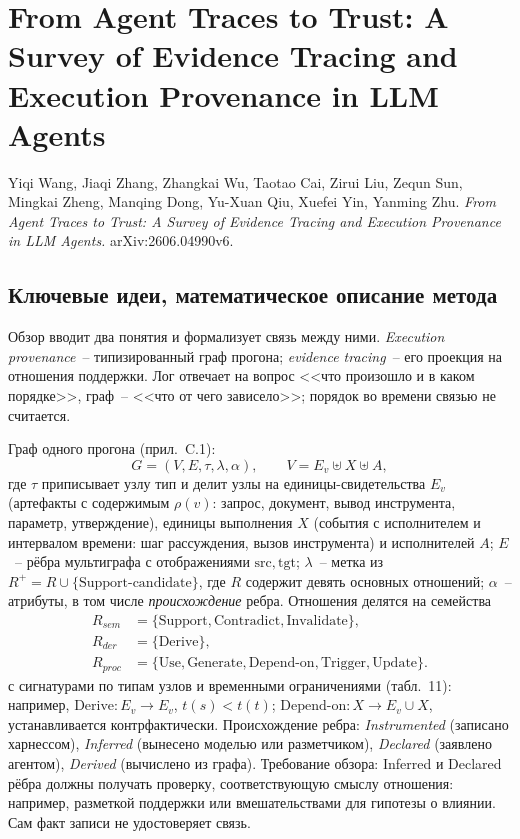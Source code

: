 \section{From Agent Traces to Trust: A Survey of Evidence Tracing and Execution Provenance in LLM Agents}

Yiqi Wang, Jiaqi Zhang, Zhangkai Wu, Taotao Cai, Zirui Liu, Zequn Sun, Mingkai Zheng,
Manqing Dong, Yu-Xuan Qiu, Xuefei Yin, Yanming Zhu. \emph{From Agent Traces to Trust:
A Survey of Evidence Tracing and Execution Provenance in LLM Agents.} arXiv:2606.04990v6.

\cite{wang2026survey}

\subsection{Ключевые идеи, математическое описание метода}
Обзор вводит два понятия и формализует связь между ними. \emph{Execution provenance}~--
типизированный граф прогона; \emph{evidence tracing}~-- его проекция на отношения
поддержки. Лог отвечает на вопрос <<что произошло и в каком порядке>>, граф~-- <<что от чего
зависело>>; порядок во времени связью не считается.

Граф одного прогона (прил.~C.1):
\begin{equation}
G = (V, E, \tau, \lambda, \alpha), \qquad V = E_v \uplus X \uplus A,
\end{equation}
где $\tau$ приписывает узлу тип и делит узлы на единицы-свидетельства $E_v$ (артефакты
с содержимым $\rho(v)$: запрос, документ, вывод инструмента, параметр, утверждение),
единицы выполнения $X$ (события с исполнителем и интервалом времени: шаг рассуждения,
вызов инструмента) и исполнителей $A$; $E$~-- рёбра мультиграфа с отображениями
$\mathrm{src},\mathrm{tgt}$; $\lambda$~-- метка из
$R^+=R\cup\{\text{Support-candidate}\}$, где $R$ содержит девять основных отношений;
$\alpha$~-- атрибуты,
в том числе \emph{происхождение} ребра. Отношения делятся на семейства
\begin{equation}
\begin{aligned}
R_{sem}&=\{\text{Support},\text{Contradict},\text{Invalidate}\},\\
R_{der}&=\{\text{Derive}\},\\
R_{proc}&=\{\text{Use},\text{Generate},\text{Depend-on},\text{Trigger},\text{Update}\}.
\end{aligned}
\end{equation}
с сигнатурами по типам узлов и временными ограничениями (табл.~11): например,
$\text{Derive}: E_v\to E_v$, $t(s)<t(t)$; $\text{Depend-on}: X\to E_v\cup X$, устанавливается
контрфактически. Происхождение ребра: \emph{Instrumented} (записано харнессом),
\emph{Inferred} (вынесено моделью или разметчиком), \emph{Declared} (заявлено агентом),
\emph{Derived} (вычислено из графа). Требование обзора: Inferred и Declared рёбра должны
получать проверку, соответствующую смыслу отношения: например, разметкой поддержки
или вмешательствами для гипотезы о влиянии. Сам факт записи не удостоверяет связь.

